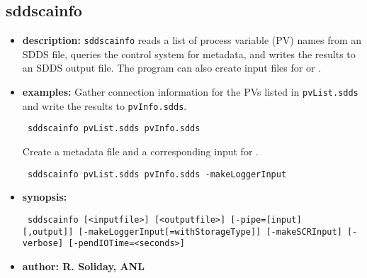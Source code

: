%
%
\begin{latexonly}
\newpage
\end{latexonly}

\subsection{sddscainfo}
\label{sddscainfo}

\begin{itemize}
\item {\bf description:}
  \verb+sddscainfo+ reads a list of process variable (PV) names from an SDDS file,
  queries the control system for metadata, and writes the results to an SDDS output file.
  The program can also create input files for  or .

\item {\bf examples:}
  Gather connection information for the PVs listed in \verb+pvList.sdds+ and write the results to \verb+pvInfo.sdds+.
  \begin{flushleft}{\tt
sddscainfo pvList.sdds pvInfo.sdds
  }\end{flushleft}
  Create a metadata file and a corresponding input for .
  \begin{flushleft}{\tt
sddscainfo pvList.sdds pvInfo.sdds -makeLoggerInput
  }\end{flushleft}

\item {\bf synopsis:}
  \begin{flushleft}{\tt
sddscainfo [<inputfile>] [<outputfile>]\
[-pipe=[input][,output]]\
[-makeLoggerInput[=withStorageType]]\
[-makeSCRInput]\
[-verbose]\
[-pendIOTime=<seconds>]
  }\end{flushleft}

\item {\bf author: R. Soliday, ANL}
\end{itemize}

